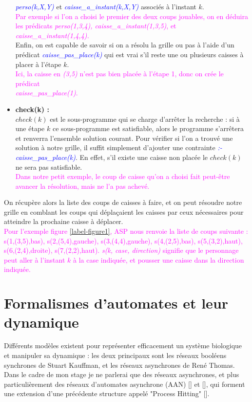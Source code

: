 \documentclass[12pt,a4paper]{article}
\begin{document}
\begin{itemize}
		\emph{\textcolor{blue}{perso(k,X,Y)}} et \emph{\textcolor{blue}{caisse\_a\_instant(k,X,Y)}} associés à l'instant $k$.\\
		\textcolor{magenta}{Par exemple si l'on a choisi le premier des deux coups jouables, on en déduira les prédicats \emph{perso(1,3,4), caisse\_a\_instant(1,3,5)}, et \emph{caisse\_a\_instant(1,4,4).}}\\
		Enfin, on est capable de savoir si on a résolu la grille ou pas à l'aide d'un prédicat \emph{\textcolor{blue}{caisse\_pas\_place(k)}} qui est vrai s'il reste une ou plusieurs caisses à placer à l'étape $k$.\\
		\textcolor{magenta}{Ici, la caisse en \emph{(3,5)} n'est pas bien placée à l'étape 1, donc on crée le prédicat \\
		\emph{caisse\_pas\_place(1)}.}\\
	\item \textbf{check(k) :}\\
		$check(k)$ est le sous-programme qui se charge d'arrêter la recherche : si à une étape $k$ ce sous-programme est satisfiable, alors le programme s'arrêtera et renverra l'ensemble solution courant. Pour vérifier si 
		l'on a trouvé une solution à notre grille, il suffit simplement d'ajouter une contrainte \emph{\textcolor{blue}{:- caisse\_pas\_place(k)}}. En effet, s'il existe une caisse non placée le $check(k)$ ne sera pas 
		satisfiable.\\
		\textcolor{magenta}{Dans notre petit exemple, le coup de caisse qu'on a choisi fait peut-être avancer la résolution, mais ne l'a pas achevé.}\\
\end{itemize}
On récupère alors la liste des coups de caisses à faire, et on peut résoudre notre grille en comblant les coups qui déplaçaient les caisses par ceux nécessaires pour atteindre la prochaine caisse à déplacer.\\
\textcolor{magenta}{Pour l'exemple figure \ref{label-figure1}, ASP nous renvoie la liste de coups suivante : s(1,(3,5),bas), s(2,(5,4),gauche), s(3,(4,4),gauche), s(4,(2,5),bas), s(5,(3,2),haut), s(6,(2,4),droite), s(7,(2,2),haut). 
\emph{s(k, case, direction)} signifie que le personnage peut aller à l'instant $k$ à la case indiquée, et pousser une caisse dans la direction indiquée.}

\section{Formalismes d'automates et leur dynamique}
Différents modèles existent pour représenter efficacement un système biologique et manipuler sa dynamique : les deux principaux sont les réseaux booléens synchrones de Stuart Kauffman, et les réseaux asynchrones de René Thomas.
Dans le cadre de mon stage je ne parlerai que des réseaux asynchrones, et plus particulièrement des réseaux d'automates asynchrone (AAN) [\cite{folschette2015sufficient}] et [\cite{pauleve2016pint}], qui forment une extension d'une précédente 
structure appelé "Process Hitting" [\cite{pauleve14}].\\
\end{document}
